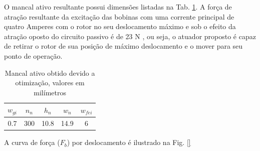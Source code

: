 O mancal ativo resultante possui dimensões listadas na Tab. \ref{tab:ativo:resultado}. A força de atração resultante da excitação das bobinas com uma corrente principal de quatro Amperes com o rotor no seu deslocamento máximo e sob o efeito da atração oposto do circuito passivo é de 23 N , ou seja, o atuador proposto é capaz de retirar o rotor de sua posição de máximo deslocamento e o mover para seu ponto de operação.

\begin{table}[ht!]
	\centering
	\begin{tabular}{c c c c c}
		 $w_{gi}$ 	& $n_n$ & $h_n$ & $w_n$ & $w_{fei}$  \\ \hline \hline
		 0.7		& 300  	& 10.8 	& 14.9	& 6
	\end{tabular} 
	\caption{Mancal ativo obtido devido a otimização, valores em milímetros}
	\label{tab:ativo:resultado} 
\end{table}

A curva de força ($F_b$) por deslocamento é ilustrado na Fig. \ref{}


%

